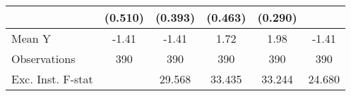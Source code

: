{\begin{tabular}{l*{5}{c}}
            &     (0.510)         &     (0.393)         &     (0.463)         &     (0.290)         &                     \\
\midrule
Mean Y      &       -1.41         &       -1.41         &        1.72         &        1.98         &       -1.41         \\
Observations&         390         &         390         &         390         &         390         &         390         \\
Exc. Inst. F-stat&                     &      29.568         &      33.435         &      33.244         &      24.680         \\
\bottomrule
\end{tabular}
}
